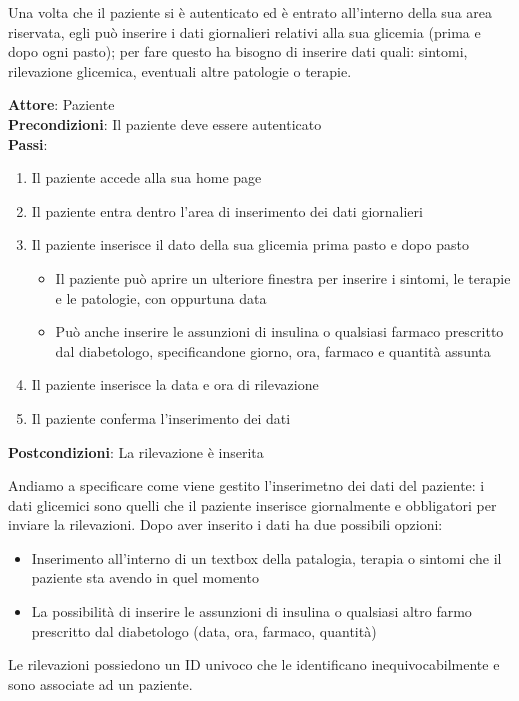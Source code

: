 \documentclass[a4paper]{article}
\begin{document}
Una volta che il paziente si è autenticato ed è entrato all'interno della sua area riservata, egli può
inserire i dati giornalieri relativi alla sua glicemia (prima e dopo ogni pasto); per fare questo
ha bisogno di inserire dati quali: sintomi, rilevazione glicemica, eventuali altre patologie o terapie.
\begin{mdframed}
  \textbf{Attore}: Paziente\\
  \textbf{Precondizioni}: Il paziente deve essere autenticato\\
  \textbf{Passi}: 
  \begin{enumerate}[nosep]
    \item Il paziente accede alla sua home page
    \item Il paziente entra dentro l'area di inserimento dei dati giornalieri
    \item  Il paziente inserisce il dato della sua glicemia prima pasto e dopo pasto
    \begin{itemize}
		\item  Il paziente può aprire un ulteriore finestra per inserire i sintomi, le terapie e le patologie, con oppurtuna data 
		\item  Può anche inserire le assunzioni di insulina o qualsiasi farmaco prescritto dal diabetologo, specificandone giorno, ora, farmaco e quantità assunta
	\end{itemize}
	\item Il paziente inserisce la data e ora di rilevazione
	\item Il paziente conferma l'inserimento dei dati
  \end{enumerate}
  \textbf{Postcondizioni}: La rilevazione è inserita 
\end{mdframed}
\noindent
Andiamo a specificare come viene gestito l'inserimetno dei dati del paziente: i dati glicemici sono quelli
che il paziente inserisce giornalmente e obbligatori per inviare la rilevazioni. Dopo aver inserito i dati ha due possibili opzioni:
\begin{itemize}
	\item Inserimento all'interno di un textbox della patalogia, terapia o sintomi che il paziente sta avendo in quel momento
	\item La possibilità di inserire le assunzioni di insulina o qualsiasi altro farmo prescritto dal diabetologo (data, ora, farmaco, quantità) 
\end{itemize}
Le rilevazioni possiedono un ID univoco che le identificano inequivocabilmente e sono associate ad un paziente.
\end{document}
